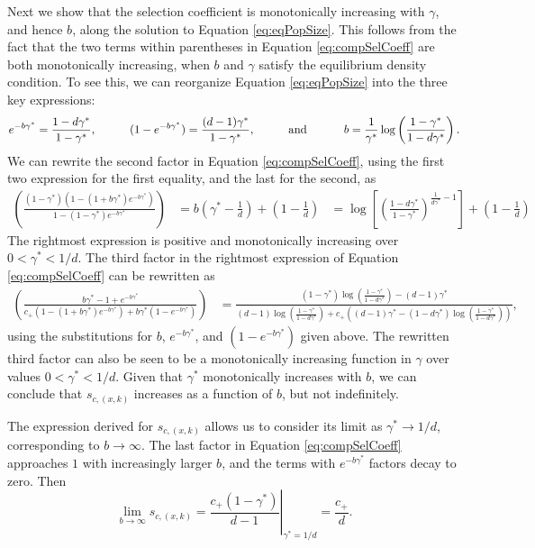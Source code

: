 \documentclass[9pt,twocolumn,twoside,lineno]{gsajnl}
\begin{document}
Next we show that the selection coefficient is monotonically increasing with $\gamma$, and hence $b$, along the solution to Equation \eqref{eq:eqPopSize}. This follows from the fact that the two terms within parentheses in Equation \ref{eq:compSelCoeff} are both monotonically increasing, when $b$ and $\gamma$ satisfy the equilibrium density condition. To see this, we can reorganize Equation \eqref{eq:eqPopSize} into the three key expressions: 
\[
e^{-b\gamma^*} = \frac{1-d\gamma^*}{1-\gamma^*}, \hspace{.4in} (1-e^{-b\gamma^*}) = \frac{(d-1)\gamma^*}{1-\gamma^*}, \hspace{.4in} \text{and }\hspace{.4in} b = \frac{1}{\gamma^*}\log\left(\frac{1-\gamma^*}{1-d\gamma^*}\right).
\]
We can rewrite the second factor in Equation \ref{eq:compSelCoeff}, using the first two expression for the first equality, and the last for the second, as
\[
\begin{aligned}
\left(\frac{(1-\gamma^*)(1-(1+b\gamma^*)e^{-b\gamma^*})}{1-(1-\gamma^*)e^{-b\gamma^*}}\right) &= b\left(\gamma^*-\frac{1}{d}\right) + \left(1-\frac{1}{d}\right) &= \log \left[ \left( \frac{1-d\gamma^*}{1-\gamma^*}\right)^{\frac{1}{d\gamma^*}-1} \right] + \left(1-\frac{1}{d}\right)
\end{aligned}
\]
The rightmost expression is positive and monotonically increasing over $0<\gamma^*<1/d$. The third factor in the rightmost expression of Equation \ref{eq:compSelCoeff} can be rewritten as
\[
\begin{aligned}
\left( \frac{b\gamma^*-1+e^{-b\gamma^*}}{{c_+(1-(1+b\gamma^*)e^{-b\gamma^*})}+{b\gamma^*(1-e^{-b\gamma^*})}}\right) &= \frac{(1-\gamma^*)\log \left(\frac{1-\gamma^*}{1-d\gamma^*} \right) - (d-1)\gamma^*}{(d-1)\log \left(\frac{1-\gamma^*}{1-d\gamma^*} \right)+c_+\left( (d-1)\gamma^*-(1-d\gamma^*)\log \left(\frac{1-\gamma^*}{1-d\gamma^*} \right) \right)},
\end{aligned}
\]
using the substitutions for $b$, $e^{-b\gamma^*}$, and $(1-e^{-b\gamma^*})$ given above. The rewritten third factor can also be seen to be a monotonically increasing function in $\gamma$ over values $0<\gamma^*<1/d$. Given that $\gamma^*$ monotonically increases with $b$, we can conclude that $s_{c,(x,k)}$ increases as a function of $b$, but not indefinitely.

The expression derived for $s_{c,(x,k)}$ allows us to consider its limit as $\gamma^* \rightarrow 1/d$, corresponding to $b\rightarrow \infty$. The last factor in Equation \ref{eq:compSelCoeff} approaches $1$ with increasingly larger $b$, and the terms with $e^{-b\gamma^*}$ factors decay to zero. Then 
\[
\lim_{b\rightarrow \infty} s_{c,(x,k)} = \left.\frac{c_+(1-\gamma^*)}{d-1}\right|_{\gamma^*=1/d} = \frac{c_+}{d}.
\]
\end{document}
